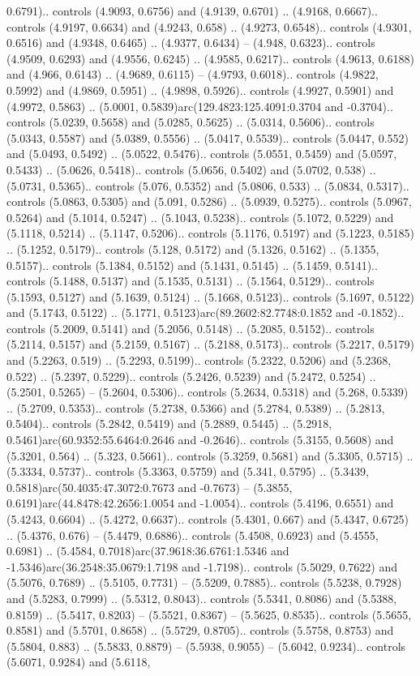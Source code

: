0.6791).. controls (4.9093, 0.6756) and (4.9139, 0.6701) .. (4.9168, 0.6667).. controls (4.9197, 0.6634) and (4.9243, 0.658) .. (4.9273, 0.6548).. controls (4.9301, 0.6516) and (4.9348, 0.6465) .. (4.9377, 0.6434) -- (4.948, 0.6323).. controls (4.9509, 0.6293) and (4.9556, 0.6245) .. (4.9585, 0.6217).. controls (4.9613, 0.6188) and (4.966, 0.6143) .. (4.9689, 0.6115) -- (4.9793, 0.6018).. controls (4.9822, 0.5992) and (4.9869, 0.5951) .. (4.9898, 0.5926).. controls (4.9927, 0.5901) and (4.9972, 0.5863) .. (5.0001, 0.5839)arc(129.4823:125.4091:0.3704 and -0.3704).. controls (5.0239, 0.5658) and (5.0285, 0.5625) .. (5.0314, 0.5606).. controls (5.0343, 0.5587) and (5.0389, 0.5556) .. (5.0417, 0.5539).. controls (5.0447, 0.552) and (5.0493, 0.5492) .. (5.0522, 0.5476).. controls (5.0551, 0.5459) and (5.0597, 0.5433) .. (5.0626, 0.5418).. controls (5.0656, 0.5402) and (5.0702, 0.538) .. (5.0731, 0.5365).. controls (5.076, 0.5352) and (5.0806, 0.533) .. (5.0834, 0.5317).. controls (5.0863, 0.5305) and (5.091, 0.5286) .. (5.0939, 0.5275).. controls (5.0967, 0.5264) and (5.1014, 0.5247) .. (5.1043, 0.5238).. controls (5.1072, 0.5229) and (5.1118, 0.5214) .. (5.1147, 0.5206).. controls (5.1176, 0.5197) and (5.1223, 0.5185) .. (5.1252, 0.5179).. controls (5.128, 0.5172) and (5.1326, 0.5162) .. (5.1355, 0.5157).. controls (5.1384, 0.5152) and (5.1431, 0.5145) .. (5.1459, 0.5141).. controls (5.1488, 0.5137) and (5.1535, 0.5131) .. (5.1564, 0.5129).. controls (5.1593, 0.5127) and (5.1639, 0.5124) .. (5.1668, 0.5123).. controls (5.1697, 0.5122) and (5.1743, 0.5122) .. (5.1771, 0.5123)arc(89.2602:82.7748:0.1852 and -0.1852).. controls (5.2009, 0.5141) and (5.2056, 0.5148) .. (5.2085, 0.5152).. controls (5.2114, 0.5157) and (5.2159, 0.5167) .. (5.2188, 0.5173).. controls (5.2217, 0.5179) and (5.2263, 0.519) .. (5.2293, 0.5199).. controls (5.2322, 0.5206) and (5.2368, 0.522) .. (5.2397, 0.5229).. controls (5.2426, 0.5239) and (5.2472, 0.5254) .. (5.2501, 0.5265) -- (5.2604, 0.5306).. controls (5.2634, 0.5318) and (5.268, 0.5339) .. (5.2709, 0.5353).. controls (5.2738, 0.5366) and (5.2784, 0.5389) .. (5.2813, 0.5404).. controls (5.2842, 0.5419) and (5.2889, 0.5445) .. (5.2918, 0.5461)arc(60.9352:55.6464:0.2646 and -0.2646).. controls (5.3155, 0.5608) and (5.3201, 0.564) .. (5.323, 0.5661).. controls (5.3259, 0.5681) and (5.3305, 0.5715) .. (5.3334, 0.5737).. controls (5.3363, 0.5759) and (5.341, 0.5795) .. (5.3439, 0.5818)arc(50.4035:47.3072:0.7673 and -0.7673) -- (5.3855, 0.6191)arc(44.8478:42.2656:1.0054 and -1.0054).. controls (5.4196, 0.6551) and (5.4243, 0.6604) .. (5.4272, 0.6637).. controls (5.4301, 0.667) and (5.4347, 0.6725) .. (5.4376, 0.676) -- (5.4479, 0.6886).. controls (5.4508, 0.6923) and (5.4555, 0.6981) .. (5.4584, 0.7018)arc(37.9618:36.6761:1.5346 and -1.5346)arc(36.2548:35.0679:1.7198 and -1.7198).. controls (5.5029, 0.7622) and (5.5076, 0.7689) .. (5.5105, 0.7731) -- (5.5209, 0.7885).. controls (5.5238, 0.7928) and (5.5283, 0.7999) .. (5.5312, 0.8043).. controls (5.5341, 0.8086) and (5.5388, 0.8159) .. (5.5417, 0.8203) -- (5.5521, 0.8367) -- (5.5625, 0.8535).. controls (5.5655, 0.8581) and (5.5701, 0.8658) .. (5.5729, 0.8705).. controls (5.5758, 0.8753) and (5.5804, 0.883) .. (5.5833, 0.8879) -- (5.5938, 0.9055) -- (5.6042, 0.9234).. controls (5.6071, 0.9284) and (5.6118, 